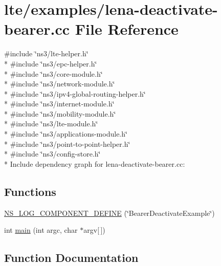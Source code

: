 \hypertarget{lena-deactivate-bearer_8cc}{}\section{lte/examples/lena-\/deactivate-\/bearer.cc File Reference}
\label{lena-deactivate-bearer_8cc}
{\ttfamily \#include \char`\"{}ns3/lte-\/helper.\+h\char`\"{}}\\*
{\ttfamily \#include \char`\"{}ns3/epc-\/helper.\+h\char`\"{}}\\*
{\ttfamily \#include \char`\"{}ns3/core-\/module.\+h\char`\"{}}\\*
{\ttfamily \#include \char`\"{}ns3/network-\/module.\+h\char`\"{}}\\*
{\ttfamily \#include \char`\"{}ns3/ipv4-\/global-\/routing-\/helper.\+h\char`\"{}}\\*
{\ttfamily \#include \char`\"{}ns3/internet-\/module.\+h\char`\"{}}\\*
{\ttfamily \#include \char`\"{}ns3/mobility-\/module.\+h\char`\"{}}\\*
{\ttfamily \#include \char`\"{}ns3/lte-\/module.\+h\char`\"{}}\\*
{\ttfamily \#include \char`\"{}ns3/applications-\/module.\+h\char`\"{}}\\*
{\ttfamily \#include \char`\"{}ns3/point-\/to-\/point-\/helper.\+h\char`\"{}}\\*
{\ttfamily \#include \char`\"{}ns3/config-\/store.\+h\char`\"{}}\\*
Include dependency graph for lena-\/deactivate-\/bearer.cc\+:
\subsection*{Functions}
\begin{DoxyCompactItemize}
\item 
\hyperlink{lena-deactivate-bearer_8cc_a9198e83a9c99964ea75b01f03f92ebf0}{N\+S\+\_\+\+L\+O\+G\+\_\+\+C\+O\+M\+P\+O\+N\+E\+N\+T\+\_\+\+D\+E\+F\+I\+NE} (\char`\"{}Bearer\+Deactivate\+Example\char`\"{})
\item 
int \hyperlink{lena-deactivate-bearer_8cc_a0ddf1224851353fc92bfbff6f499fa97}{main} (int argc, char $\ast$argv\mbox{[}$\,$\mbox{]})
\end{DoxyCompactItemize}


\subsection{Function Documentation}
